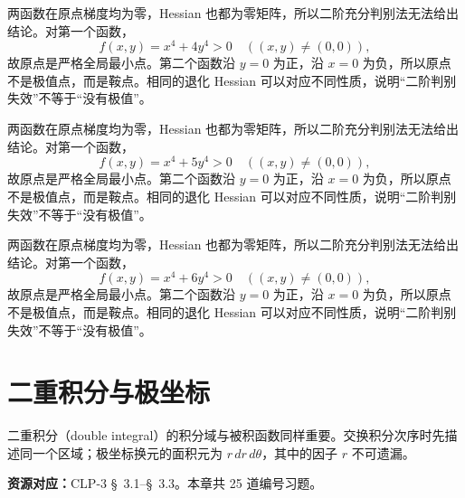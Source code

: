 \documentclass[UTF8,12pt,a4paper,fontset=fandol]{ctexart}
\begin{document}
\begin{solve}\label{ans:c35q22}
两函数在原点梯度均为零，Hessian 也都为零矩阵，所以二阶充分判别法无法给出结论。对第一个函数，
\[
f(x,y)=x^4+4y^4>0\quad((x,y)\ne(0,0)),
\]
故原点是严格全局最小点。第二个函数沿 $y=0$ 为正，沿 $x=0$ 为负，所以原点不是极值点，而是鞍点。相同的退化 Hessian 可以对应不同性质，说明“二阶判别失效”不等于“没有极值”。
\end{solve}

\begin{solve}\label{ans:c35q23}
两函数在原点梯度均为零，Hessian 也都为零矩阵，所以二阶充分判别法无法给出结论。对第一个函数，
\[
f(x,y)=x^4+5y^4>0\quad((x,y)\ne(0,0)),
\]
故原点是严格全局最小点。第二个函数沿 $y=0$ 为正，沿 $x=0$ 为负，所以原点不是极值点，而是鞍点。相同的退化 Hessian 可以对应不同性质，说明“二阶判别失效”不等于“没有极值”。
\end{solve}

\begin{solve}\label{ans:c35q24}
两函数在原点梯度均为零，Hessian 也都为零矩阵，所以二阶充分判别法无法给出结论。对第一个函数，
\[
f(x,y)=x^4+6y^4>0\quad((x,y)\ne(0,0)),
\]
故原点是严格全局最小点。第二个函数沿 $y=0$ 为正，沿 $x=0$ 为负，所以原点不是极值点，而是鞍点。相同的退化 Hessian 可以对应不同性质，说明“二阶判别失效”不等于“没有极值”。
\end{solve}

\clearpage
\section{二重积分与极坐标}\label{sec:ch36}
二重积分（double integral）的积分域与被积函数同样重要。交换积分次序时先描述同一个区域；极坐标换元的面积元为 $r\,dr\,d\theta$，其中的因子 $r$ 不可遗漏。

\textbf{资源对应：}CLP-3 \S~3.1--\S~3.3。本章共 25 道编号习题。
\end{document}

